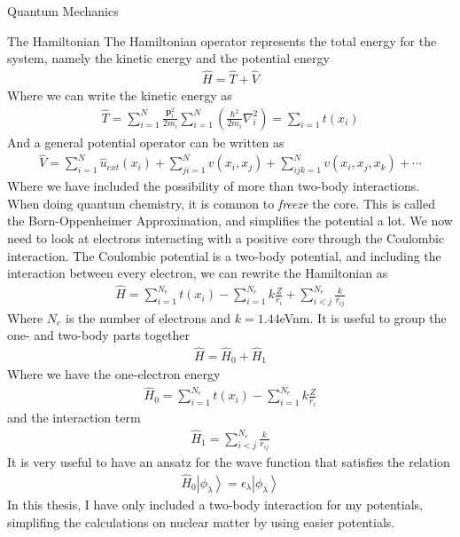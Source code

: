 \documentclass[twoside,english]{uiofysmaster}
\begin{document}
\begin{chapter}{Quantum Mechanics}
 	\begin{section}{The Hamiltonian}
 		The Hamiltonian operator represents the total energy for the system, namely the kinetic energy and the potential energy
 		\begin{align}
 			\hat H = \hat T + \hat V
 		\end{align}
 		Where we can write the kinetic energy as \cite{MHJSlides}
 		\begin{align}
 			\hat T = \sum_{i=1}^N \frac{ \mathbf{p}_i^2}{2m_i} \sum_{i=1}^N \left( \frac{\hbar^2}{2m_i} \nabla_i^2 \right) = \sum_{i=1} t(x_i)
 		\end{align}
 		And a general potential operator can be written as
 		\begin{align}
 			\hat V = \sum_{i=1}^N \hat u_{ext}(x_i) + \sum_{ji = 1}^N v(x_i,x_j) + \sum_{ijk=1}^N v(x_i,x_j,x_k) + \cdots 
 		\end{align}
 		Where we have included the possibility of more than two-body interactions. When doing quantum chemistry, it is common to \textit{freeze} the core. This is called the Born-Oppenheimer Approximation, and simplifies the potential a lot. We now need to look at electrons interacting with a positive core through the Coulombic interaction. The Coulombic potential is a two-body potential, and including the interaction between every electron, we can rewrite the Hamiltonian as
 		\begin{align}
 			\hat H = \sum_{i=1}^{N_e} t(x_i) - \sum_{i=1}^{N_e} k \frac{Z}{r_i} + \sum_{i<j}^{N_e} \frac{k}{r_{ij}}
 		\end{align}
 		Where $N_e$ is the number of electrons and $k = 1.44$eVnm. It is useful to group the one- and two-body parts together
 		\begin{align}
 			\hat H = \hat H_0 + \hat H_1
 		\end{align}
 		Where we have the one-electron energy
 		\begin{align}
 			\hat H_0 = \sum_{i=1}^{N_e} t(x_i) - \sum_{i=1}^{N_e} k \frac{Z}{r_i}
 		\end{align}
 		and the interaction term
 		\begin{align}
 			\hat H_1 = \sum_{i<j}^{N_e} \frac{k}{r_{ij}}
 		\end{align}
 		It is very useful to have an ansatz for the wave function that satisfies the relation
 		\begin{align}
 			\hat H_0 \left| \phi_\lambda \right> = \epsilon_\lambda \left| \phi_\lambda \right>
 		\end{align}
 		In this thesis, I have only included a two-body interaction for my potentials, simplifing the calculations on nuclear matter by using easier potentials. 
 	\end{section}


\end{chapter}
\end{document}
